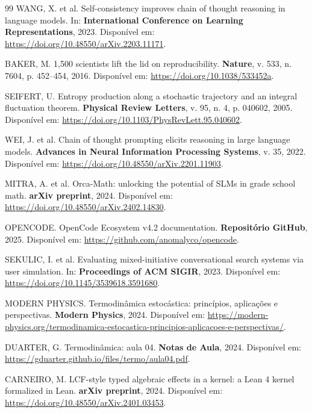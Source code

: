 \documentclass[5p]{elsarticle}
\theoremstyle{remark}
\begin{document}
\begin{thebibliography}{99}
WANG, X. et al. Self-consistency improves chain of thought reasoning in language models. In: \textbf{International Conference on Learning Representations}, 2023. Disponível em: \url{https://doi.org/10.48550/arXiv.2203.11171}.

BAKER, M. 1,500 scientists lift the lid on reproducibility. \textbf{Nature}, v. 533, n. 7604, p. 452--454, 2016. Disponível em: \url{https://doi.org/10.1038/533452a}.

SEIFERT, U. Entropy production along a stochastic trajectory and an integral fluctuation theorem. \textbf{Physical Review Letters}, v. 95, n. 4, p. 040602, 2005. Disponível em: \url{https://doi.org/10.1103/PhysRevLett.95.040602}.

WEI, J. et al. Chain of thought prompting elicits reasoning in large language models. \textbf{Advances in Neural Information Processing Systems}, v. 35, 2022. Disponível em: \url{https://doi.org/10.48550/arXiv.2201.11903}.

MITRA, A. et al. Orca-Math: unlocking the potential of SLMs in grade school math. \textbf{arXiv preprint}, 2024. Disponível em: \url{https://doi.org/10.48550/arXiv.2402.14830}.

OPENCODE. OpenCode Ecosystem v4.2 documentation. \textbf{Repositório GitHub}, 2025. Disponível em: \url{https://github.com/anomalyco/opencode}.

SEKULIC, I. et al. Evaluating mixed-initiative conversational search systems via user simulation. In: \textbf{Proceedings of ACM SIGIR}, 2023. Disponível em: \url{https://doi.org/10.1145/3539618.3591680}.

MODERN PHYSICS. Termodinâmica estocástica: princípios, aplicações e perspectivas. \textbf{Modern Physics}, 2024. Disponível em: \url{https://modern-physics.org/termodinamica-estocastica-principios-aplicacoes-e-perspectivas/}.

DUARTER, G. Termodinâmica: aula 04. \textbf{Notas de Aula}, 2024. Disponível em: \url{https://gduarter.github.io/files/termo/aula04.pdf}.

CARNEIRO, M. LCF-style typed algebraic effects in a kernel: a Lean 4 kernel formalized in Lean. \textbf{arXiv preprint}, 2024. Disponível em: \url{https://doi.org/10.48550/arXiv.2401.03453}.


\end{thebibliography}
\end{document}
